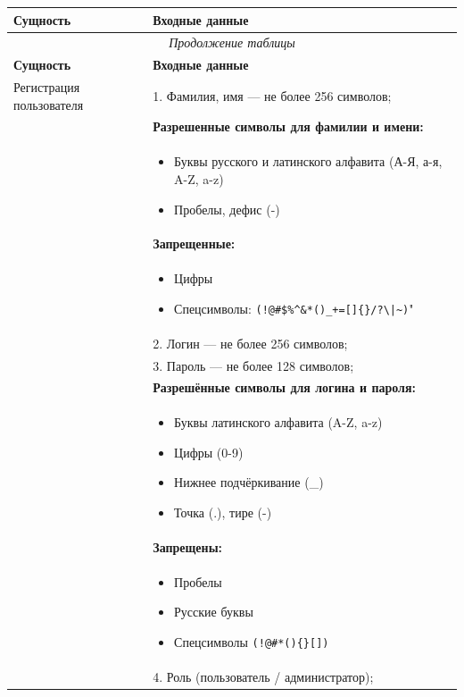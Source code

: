 \begin{longtable}{|p{6cm}|p{10.5cm}|}
    \hline
    \textbf{Сущность} & \textbf{Входные данные} \\
    \hline
    \endfirsthead
    \multicolumn{2}{c}{\textit{Продолжение таблицы \thetable{}}} \\
    \hline
    \textbf{Сущность} & \textbf{Входные данные} \\
    \hline
    \endhead
    Регистрация пользователя &
    1. Фамилия, имя — не более 256 символов; \\
    & \textbf{Разрешенные символы для фамилии и имени:} \\
    & \begin{itemize}
        \item Буквы русского и латинского алфавита (А-Я, а-я, A-Z, a-z)
        \item Пробелы, дефис (-)
    \end{itemize} \\
    & \textbf{Запрещенные:} \\
    & \begin{itemize}
        \item Цифры
        \item Спецсимволы: \verb"(!@#$%^&*()_+=[]{}/?\|~)"
    \end{itemize} \\
    & 2. Логин — не более 256 символов;\\
    & 3. Пароль — не более 128 символов; \\
    & \textbf{Разрешённые символы для логина и пароля:} \\
    & \begin{itemize}
        \item Буквы латинского алфавита (A-Z, a-z)
        \item Цифры (0-9)
        \item Нижнее подчёркивание (\_)
        \item Точка (.), тире (-)
    \end{itemize} \\
    & \textbf{Запрещены:} \\
    & \begin{itemize}
        \item Пробелы
        \item Русские буквы
        \item Спецсимволы \verb"(!@#*(){}[])"
    \end{itemize}\\
    & 4. Роль (пользователь / администратор);\\

\end{longtable}
